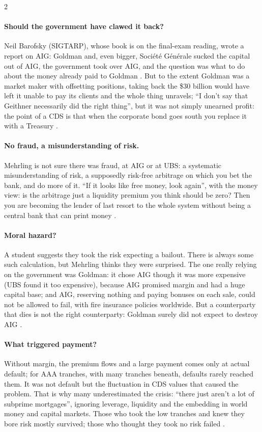\begin{paracol}{2}
\paragraph{Should the government have clawed it back?} Neil Barofsky (SIGTARP), whose book is on the final-exam reading, wrote a report on AIG: Goldman and, even bigger,
Soci\'et\'e G\'en\'erale sucked the capital out of AIG, the government took over AIG, and the question was what to do about the money already paid to Goldman
. But to the extent Goldman was a market maker with offsetting positions, taking back the \$30 billion would have left it
unable to pay its clients and the whole thing unravels; ``I don't say that Geithner necessarily did the right thing'', but it was not simply unearned profit: the
point of a CDS is that when the corporate bond goes south you replace it with a Treasury .

\paragraph{No fraud, a misunderstanding of risk.} Mehrling is not sure there was fraud, at AIG or at UBS: a systematic misunderstanding of risk, a supposedly risk-free
arbitrage on which you bet the bank, and do more of it. ``If it looks like free money, look again'', with the money view: is the arbitrage just a liquidity premium
you think should be zero? Then you are becoming the lender of last resort to the whole system without being a central bank that can print money
.

\paragraph{Moral hazard?} A student suggests they took the risk expecting a bailout. There is always some such calculation, but Mehrling thinks they were surprised.
The one really relying on the government was Goldman: it chose AIG though it was more expensive (UBS found it too expensive), because AIG promised margin and had a
huge capital base; and AIG, reserving nothing and paying bonuses on each sale, could not be allowed to fail, with fire insurance policies worldwide. But a
counterparty that dies is not the right counterparty: Goldman surely did not expect to destroy AIG .

\paragraph{What triggered payment?} Without margin, the premium flows and a large payment comes only at actual default; for AAA tranches, with many tranches beneath,
defaults rarely reached them. It was not default but the fluctuation in CDS values that caused the problem. That is why many underestimated the crisis: ``there
just aren't a lot of subprime mortgages'', ignoring leverage, liquidity and the embedding in world money and capital markets. Those who took the low tranches and
knew they bore risk mostly survived; those who thought they took no risk failed .


\end{paracol}
